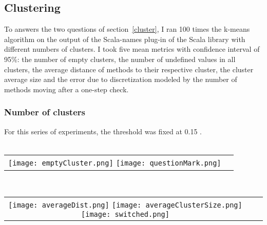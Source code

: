 \documentclass[12pt]{article}
\begin{document}
\subsection {Clustering}
\label{cluster:exp}
To answers the two questions of section~\ref{cluster}, I ran 100 times the k-means algorithm on the output of the Scala-names plug-in of the Scala library with different numbers of clusters. I took five mean metrics with confidence interval of 95\%: the number of empty clusters, the number of undefined values in all clusters, the average distance of methods to their respective cluster, the cluster average size and the error due to discretization modeled by the number of methods moving after a one-step check. 
\subsubsection{Number of clusters}
For this series of experiments, the threshold was fixed at 0.15 . 
\\ \\
\begin{center}
\begin{tabular}{c c}
\texttt{[image: emptyCluster.png]}
\texttt{[image: questionMark.png]}
\end{tabular}\\
\begin{tabular}{c c c}
\texttt{[image: averageDist.png]}
\texttt{[image: averageClusterSize.png]}
\texttt{[image: switched.png]} %
\end{tabular}
\end{center}
\end{document}
